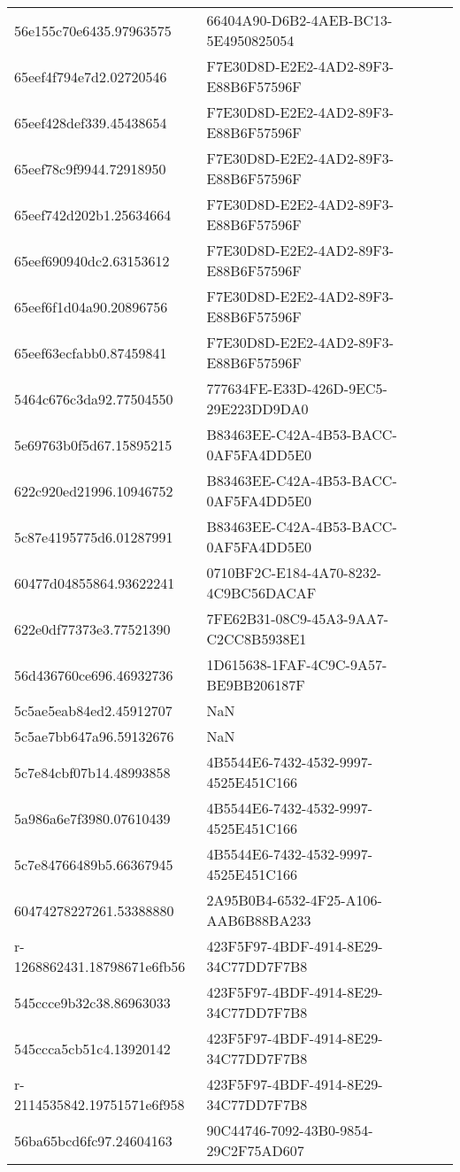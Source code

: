 \begin{tabular}{ll}
56e155c70e6435.97963575 & 66404A90-D6B2-4AEB-BC13-5E4950825054 \\
65eef4f794e7d2.02720546 & F7E30D8D-E2E2-4AD2-89F3-E88B6F57596F \\
65eef428def339.45438654 & F7E30D8D-E2E2-4AD2-89F3-E88B6F57596F \\
65eef78c9f9944.72918950 & F7E30D8D-E2E2-4AD2-89F3-E88B6F57596F \\
65eef742d202b1.25634664 & F7E30D8D-E2E2-4AD2-89F3-E88B6F57596F \\
65eef690940dc2.63153612 & F7E30D8D-E2E2-4AD2-89F3-E88B6F57596F \\
65eef6f1d04a90.20896756 & F7E30D8D-E2E2-4AD2-89F3-E88B6F57596F \\
65eef63ecfabb0.87459841 & F7E30D8D-E2E2-4AD2-89F3-E88B6F57596F \\
5464c676c3da92.77504550 & 777634FE-E33D-426D-9EC5-29E223DD9DA0 \\
5e69763b0f5d67.15895215 & B83463EE-C42A-4B53-BACC-0AF5FA4DD5E0 \\
622c920ed21996.10946752 & B83463EE-C42A-4B53-BACC-0AF5FA4DD5E0 \\
5c87e4195775d6.01287991 & B83463EE-C42A-4B53-BACC-0AF5FA4DD5E0 \\
60477d04855864.93622241 & 0710BF2C-E184-4A70-8232-4C9BC56DACAF \\
622e0df77373e3.77521390 & 7FE62B31-08C9-45A3-9AA7-C2CC8B5938E1 \\
56d436760ce696.46932736 & 1D615638-1FAF-4C9C-9A57-BE9BB206187F \\
5c5ae5eab84ed2.45912707 & NaN \\
5c5ae7bb647a96.59132676 & NaN \\
5c7e84cbf07b14.48993858 & 4B5544E6-7432-4532-9997-4525E451C166 \\
5a986a6e7f3980.07610439 & 4B5544E6-7432-4532-9997-4525E451C166 \\
5c7e84766489b5.66367945 & 4B5544E6-7432-4532-9997-4525E451C166 \\
60474278227261.53388880 & 2A95B0B4-6532-4F25-A106-AAB6B88BA233 \\
r-1268862431.18798671e6fb56 & 423F5F97-4BDF-4914-8E29-34C77DD7F7B8 \\
545ccce9b32c38.86963033 & 423F5F97-4BDF-4914-8E29-34C77DD7F7B8 \\
545ccca5cb51c4.13920142 & 423F5F97-4BDF-4914-8E29-34C77DD7F7B8 \\
r-2114535842.19751571e6f958 & 423F5F97-4BDF-4914-8E29-34C77DD7F7B8 \\
56ba65bcd6fc97.24604163 & 90C44746-7092-43B0-9854-29C2F75AD607 \\

\end{tabular}
